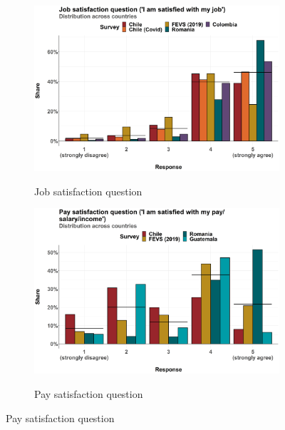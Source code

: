 \documentclass{article}
\begin{document}
\clearpage


\begin{figure}[htbp]
\centering
\caption{Distribution of responses to:}
\begin{adjustbox}{max width=1.6\linewidth,center}
\begin{subfigure}{1.2\textwidth}
\caption{\large{Job satisfaction question}}
\includegraphics[width= 1\linewidth]{Figures_manual/Variation across countries - satisf_q.png}
\label{fig:dist_satisf_q}
\end{subfigure}
\end{adjustbox}

\hfill

\begin{adjustbox}{max width=1.6\linewidth,center}
\begin{subfigure}{1.2\textwidth}
\caption{\large{Pay satisfaction question}}
\includegraphics[width= 1\linewidth]{Figures_manual/Variation across countries - pay_satisf_q.png}
\label{fig:dist_pay_satisf_q}
\end{subfigure}

\end{adjustbox}
\label{fig:chile_sample_ci_3}
\end{figure}
\end{document}
